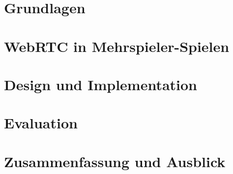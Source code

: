 \documentclass[oneside,11pt,a4paper,bibliography=totocnumbered,numbers=noenddot]{scrreprt}
\begin{document}
\chapter{Grundlagen}


\chapter{WebRTC in Mehrspieler-Spielen}


\chapter{Design und Implementation}


\chapter{Evaluation}
%
\chapter{Zusammenfassung und Ausblick}
%

%


\clearpage

\end{document}
